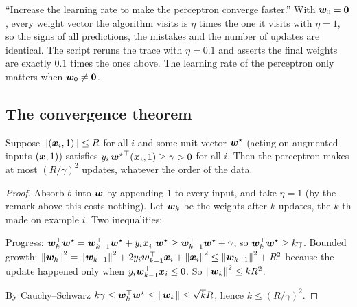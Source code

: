 \begin{center}
\end{center}

\begin{remark}
	\trap ``Increase the learning rate to make the perceptron converge faster.''
	With ${\bm{w}}_0={\bm{0}}$, every weight vector the algorithm visits is $\eta$ times the
	one it visits with $\eta=1$, so the signs of all predictions, the mistakes and
	the number of updates are identical. The script reruns the trace with $\eta=0.1$
	and asserts the final weights are exactly $0.1$ times the ones above. The
	learning rate of the perceptron only matters when ${\bm{w}}_0\neq{\bm{0}}$.
\end{remark}

\subsection{The convergence theorem}
\begin{theorem}
	Suppose $\left\lVert ({\bm{x}}_i,1) \right\rVert\le R$ for all $i$ and some unit vector ${\bm{w}}^\star$
	(acting on augmented inputs $({\bm{x}},1)$) satisfies $y_i\,{{\bm{w}}^\star}^{\top}({\bm{x}}_i,1)\ge\gamma>0$ for all
	$i$. Then the perceptron makes at most $(R/\gamma)^2$ updates, whatever the
	order of the data.
\end{theorem}
\begin{proof}
	Absorb $b$ into ${\bm{w}}$ by appending $1$ to every input, and take $\eta=1$ (by the
	remark above this costs nothing). Let ${\bm{w}}_k$ be the weights after $k$ updates,
	the $k$-th made on example $i$. Two inequalities:
	\begin{itemize}
		\ii Progress: ${\bm{w}}_k^{\top}{\bm{w}}^\star = {\bm{w}}_{k-1}^{\top}{\bm{w}}^\star + y_i{\bm{x}}_i^{\top}{\bm{w}}^\star
		\ge {\bm{w}}_{k-1}^{\top}{\bm{w}}^\star + \gamma$, so ${\bm{w}}_k^{\top}{\bm{w}}^\star\ge k\gamma$.
		\ii Bounded growth: $\left\lVert {\bm{w}}_k \right\rVert^2 = \left\lVert {\bm{w}}_{k-1} \right\rVert^2 + 2y_i{\bm{w}}_{k-1}^{\top}{\bm{x}}_i +
		\left\lVert {\bm{x}}_i \right\rVert^2 \le \left\lVert {\bm{w}}_{k-1} \right\rVert^2 + R^2$ because the update happened only
		when $y_i{\bm{w}}_{k-1}^{\top}{\bm{x}}_i\le 0$. So $\left\lVert {\bm{w}}_k \right\rVert^2\le kR^2$.
	\end{itemize}
	By Cauchy--Schwarz $k\gamma\le{\bm{w}}_k^{\top}{\bm{w}}^\star\le\left\lVert {\bm{w}}_k \right\rVert\le\sqrt{k}R$, hence
	$k\le(R/\gamma)^2$.
\end{proof}

